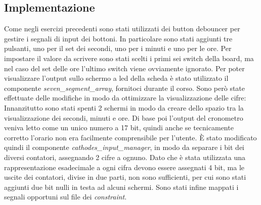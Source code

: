 \subsection{Implementazione}
Come negli esercizi precedenti sono stati utilizzati dei button debouncer per gestire i segnali di input dei bottoni. In particolare sono stati aggiunti tre pulsanti, uno per il set dei secondi, uno per i minuti e uno per le ore. Per impostare il valore da scrivere sono stati scelti i primi sei switch della board, ma nel caso del set delle ore l'ultimo switch viene ovviamente ignorato. 
Per poter visualizzare l'output sullo schermo a led della scheda è stato utilizzato il componente \textit{seven\_segment\_array}, fornitoci durante il corso. Sono però state effettuate delle modifiche in modo da ottimizzare la visualizzazione delle cifre:
Innanzitutto sono stati spenti 2 schermi in modo da creare dello spazio tra la visualizzazione dei secondi, minuti e ore. Di base poi l'output del cronometro veniva letto come un unico numero a 17 bit, quindi anche se tecnicamente corretto l'orario non era facilmente comprensibile per l'utente. È stato modificato quindi il componente \textit{cathodes\_input\_manager}, in modo da separare i bit dei diversi contatori, assegnando 2 cifre a ognuno. Dato che è stata utilizzata una rappresentazione esadecimale a ogni cifra devono essere assegnati 4 bit, ma le uscite dei contatori, divise in due parti, non sono sufficienti, per cui sono stati aggiunti due bit nulli in testa ad alcuni schermi.
Sono stati infine mappati i segnali opportuni sul file dei \textit{constraint}.

